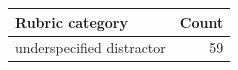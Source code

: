 \begin{tabular}{lr}
\toprule
Rubric category & Count \\
\midrule
underspecified distractor & 59 \\
\bottomrule
\end{tabular}
